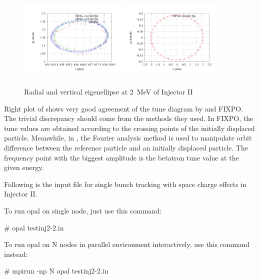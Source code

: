 \begin{figure}[tb]
\centering
   \includegraphics[width=0.45\textwidth]{figures/cyclotron/RadialEigen_Inj2}
   \includegraphics[width=0.45\textwidth]{figures/cyclotron/VertEigen_Inj2}
   \caption{Radial and vertical eigenellipse at \SI{2}{\mega\electronvolt} of Injector II}
   \label{fig:eigen}
\end{figure}


Right plot of  shows very good agreement of the tune diagram by \opalcycl and FIXPO.
The trivial discrepancy should come from the methods they used.
In FIXPO, the tune values are obtained according to the crossing points of the initially displaced particle. Meanwhile, in \opalcycl, the Fourier
analysis method is used to manipulate orbit difference between the reference particle and an initially displaced particle.
The frequency point with the biggest amplitude is the betatron tune value at the given energy.

Following is the input file for single bunch tracking with space charge effects in Injector II.


To run opal on single node, just use this command:
\begin{example}
 # opal testinj2-2.in
\end{example}

To run opal on N nodes in parallel environment interactively, use this command instead:
\begin{example}
 # mpirun -np N opal testinj2-2.in
\end{example}

